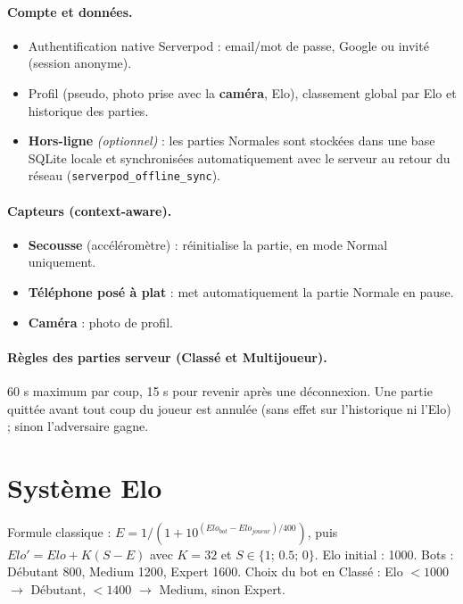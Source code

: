 \documentclass[a4paper,11pt]{article}
\begin{document}
\paragraph{Compte et données.}
\begin{itemize}
  \item Authentification native Serverpod : email/mot de passe, Google ou invité
        (session anonyme).
  \item Profil (pseudo, photo prise avec la \textbf{caméra}, Elo), classement global
        par Elo et historique des parties.
  \item \textbf{Hors-ligne} \textit{(optionnel)} : les parties Normales sont stockées
        dans une base SQLite locale et synchronisées automatiquement avec le serveur
        au retour du réseau (\texttt{serverpod\_offline\_sync}).
\end{itemize}

\paragraph{Capteurs (context-aware).}
\begin{itemize}
  \item \textbf{Secousse} (accéléromètre) : réinitialise la partie, en mode Normal
        uniquement.
  \item \textbf{Téléphone posé à plat} : met automatiquement la partie Normale en pause.
  \item \textbf{Caméra} : photo de profil.
\end{itemize}

\paragraph{Règles des parties serveur (Classé et Multijoueur).} 60 s maximum par coup,
15 s pour revenir après une déconnexion. Une partie quittée avant tout coup du joueur
est annulée (sans effet sur l'historique ni l'Elo) ; sinon l'adversaire gagne.

\section{Système Elo}

Formule classique : $E = 1 / (1 + 10^{(Elo_{bot} - Elo_{joueur})/400})$, puis
$Elo' = Elo + K(S - E)$ avec $K = 32$ et $S \in \{1;\,0.5;\,0\}$.
Elo initial : 1000. Bots : Débutant 800, Medium 1200, Expert 1600.
Choix du bot en Classé : Elo $< 1000$ $\rightarrow$ Débutant, $< 1400$ $\rightarrow$
Medium, sinon Expert.
\end{document}

